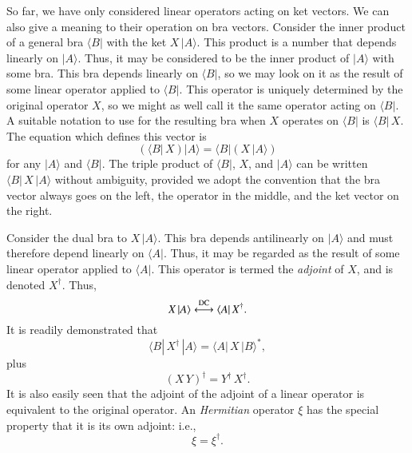 So far, we have only considered linear operators acting on ket vectors. We can also
give a meaning to their operation on bra vectors. Consider the inner product
of a general bra $\langle B|$ with the ket $X\,|A\rangle$. This product is a
number that  depends linearly on $|A\rangle$. Thus, it may be considered to
be the inner product of $|A\rangle$ with some bra. This bra depends linearly
on $\langle B|$, so we may look on it as the result of some linear
operator applied to $\langle B|$. This operator is uniquely determined by the
original operator $X$, so we might as well call it the same operator acting on
$\langle B|$. A suitable notation to use for the resulting bra when $X$ operates on
$\langle B|$ is $\langle B|\,X$. The equation which defines this
vector is
\begin{equation}\label{e2.32}
\left(\langle B|\,X\right) |A\rangle = \langle B|\left( X\,|A\rangle\right)
\end{equation}
for any $|A\rangle$ and $\langle B|$. 
The triple product of $\langle B|$, $X$, and $|A\rangle$
can be written $\langle B|\,X\,| A \rangle$ without ambiguity, provided we adopt the
convention that the bra vector always goes on the left, the operator in the middle,
and the ket vector on the right. 

Consider the dual bra to $X\,|A\rangle$. This bra depends antilinearly on
$|A\rangle$ and must therefore depend linearly on $\langle A|$. 
Thus, it may 
be regarded as the result of some linear operator applied to $\langle A|$.
This operator is termed the {\em adjoint}\/ of $X$, and is denoted $X^{\dag}$. Thus,
\begin{equation}\label{e2.33}
X \,| A\rangle \stackrel{\rm DC}{\longleftrightarrow} \langle A|\,X^{\dag}.
\end{equation}
It is readily demonstrated that
\begin{equation}
\langle B|\,X^{\dag}\,|A\rangle = \langle A|\,X\, |B\rangle^\ast,
\end{equation}
plus
\begin{equation}
(X\, Y)^{\dag} = Y^{\dag}\, X^{\dag}.
\end{equation}
It is also easily seen that the adjoint of the adjoint of a linear operator
is equivalent to the original operator. An {\em Hermitian}\/ operator $\xi$ has
the special property that it is its own adjoint:  {\rm i.e.},
\begin{equation}
\xi= \xi^{\dag}.
\end{equation}


